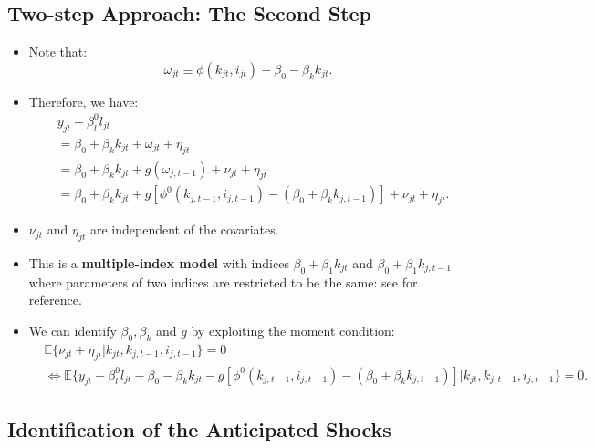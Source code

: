 \documentclass[
]{book}
\providecommand{\tightlist}{%
  \setlength{\itemsep}{0pt}\setlength{\parskip}{0pt}}
\begin{document}
\hypertarget{two-step-approach-the-second-step}{%
\subsection{Two-step Approach: The Second Step}\label{two-step-approach-the-second-step}}

\begin{itemize}
\tightlist
\item
  Note that:
  \begin{equation}
  \omega_{jt} \equiv \phi(k_{jt}, i_{jt}) - \beta_0 - \beta_k k_{jt}.
  \end{equation}
\item
  Therefore, we have:
  \begin{equation}
  \begin{split}
  &y_{jt} - \beta_l^0 l_{jt} \\
  &= \beta_0 + \beta_k k_{jt} + \omega_{jt} + \eta_{jt}\\
  &= \beta_0 + \beta_k k_{jt} + g(\omega_{j, t - 1}) + \nu_{jt} + \eta_{jt}\\
  &= \beta_0 + \beta_k k_{jt} + g[\phi^0(k_{j, t - 1}, i_{j, t - 1}) - (\beta_0 + \beta_k k_{j, t - 1})] + \nu_{jt} + \eta_{jt}.
  \end{split}
  \end{equation}
\item
  \(\nu_{jt}\) and \(\eta_{jt}\) are independent of the covariates.
\item
  This is a \textbf{multiple-index model} with indices \(\beta_0 + \beta_1 k_{jt}\) and \(\beta_0 + \beta_1 k_{j, t - 1}\) where parameters of two indices are restricted to be the same: see \citet{Ichimura2007} for reference.
\item
  We can identify \(\beta_0, \beta_k\) and \(g\) by exploiting the moment condition:
  \begin{equation}
  \begin{split}
  & \mathbb{E}\{\nu_{jt} + \eta_{jt}|k_{jt}, k_{j, t - 1}, i_{j, t - 1}\} = 0\\
  & \Leftrightarrow \mathbb{E}\{y_{jt} - \beta_l^0 l_{jt} -  \beta_0 - \beta_k k_{jt} - g[\phi^0(k_{j, t - 1}, i_{j, t - 1}) - (\beta_0 + \beta_k k_{j, t - 1})] |k_{jt}, k_{j, t - 1}, i_{j, t - 1}\} = 0.
  \end{split}
  \end{equation}
\end{itemize}

\hypertarget{identification-of-the-anticipated-shocks}{%
\subsection{Identification of the Anticipated Shocks}\label{identification-of-the-anticipated-shocks}}
\end{document}
